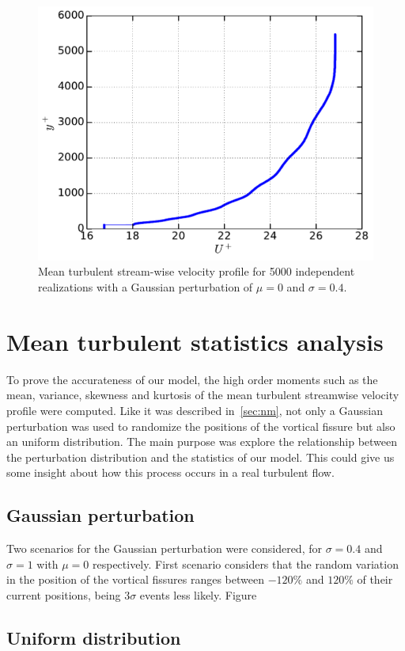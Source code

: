 \documentclass[aps,reprint,amsmath,amssymb,pra]{revtex4-1}%
\begin{document}
\begin{figure}[b]
\includegraphics[scale=0.46]{figures/Master_averaged_step_profile_5000_assembles}
\caption{\label{fig:mean_profile} Mean turbulent stream-wise velocity profile for 5000 independent realizations with a Gaussian perturbation of $\mu=0$ and $\sigma=0.4$.}
\end{figure} 
\section{Mean turbulent statistics analysis}
To prove the accurateness of our model, the high order moments such as the mean, variance, skewness and kurtosis of the mean turbulent streamwise velocity profile were computed. Like it was described in~\ref{sec:nm}, not only a Gaussian perturbation was used to randomize the positions of the vortical fissure but also an uniform distribution. The main purpose was explore the relationship between the perturbation distribution and the statistics of our model. This could give us some insight about how this process occurs in a real turbulent flow.
\subsection{Gaussian perturbation}
Two scenarios for the Gaussian perturbation were considered, for $\sigma=0.4$ and $\sigma=1$ with $\mu=0$ respectively. First scenario considers that the random variation in the position of the vortical fissures ranges between $-120\%$ and $120\%$ of their current positions, being $3\sigma$ events less likely. Figure 
\subsection{Uniform distribution}    
\end{document}
